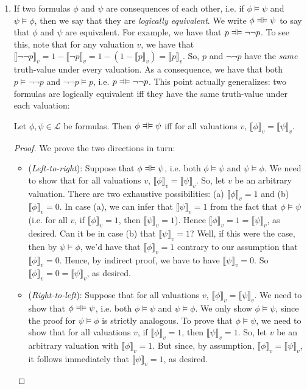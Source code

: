 \begin{enumerate}[\thesection.1]
		\item If two formulas $\phi$ and $\psi$ are consequences of each other, i.e. if $\phi\vDash\psi$ and $\psi\vDash\phi$, then we say that they are \emph{logically equivalent}. We write $\phi\equi \psi$ to say that $\phi$ and $\psi$ are equivalent. For example, we have that $p\equi \neg\neg p$. To see this, note that for any valuation $v$, we have that $\llbracket \neg\neg p\rrbracket_v=1-\llbracket \neg p\rrbracket_v=1-(1-\llbracket p\rrbracket_v)=\llbracket p\rrbracket_v$. So, $p$ and $\neg\neg p$ have the \emph{same} truth-value under every valuation. As a consequence, we have that both $p\vDash \neg\neg p$ and $\neg \neg p\vDash p$, i.e. $p\equi \neg\neg p$. This point actually generalizes: two formulas are logically equivalent iff they have the same truth-value under each valuation:
		\begin{proposition}
		Let $\phi,\psi\in\mathcal{L}$ be formulas. Then $\phi\equi\psi$ iff for all valuations $v$, $\llbracket\phi\rrbracket_v=\llbracket\psi\rrbracket_v$.
		\end{proposition}
		\begin{proof}
		We prove the two directions in turn:
		
			\begin{itemize}
			
				\item (\emph{Left-to-right}): Suppose that $\phi\equi\psi$, i.e. both $\phi\vDash\psi$ and $\psi\vDash\phi$. We need to show that for all valuations $v$, $\llbracket\phi\rrbracket_v=\llbracket\psi\rrbracket_v$. So, let $v$ be an arbitrary valuation. There are two exhaustive possibilities: (a) $\llbracket\phi\rrbracket_v=1$ and (b) $\llbracket \phi\rrbracket_v=0$. In case (a), we can infer that $\llbracket\psi\rrbracket_v=1$ from the fact that $\phi\vDash\psi$ (i.e. for all $v$, if $\llbracket\phi\rrbracket_v=1$, then $\llbracket\psi\rrbracket_v=1$). Hence $\llbracket \phi\rrbracket_v=1=\llbracket \psi\rrbracket_v$, as desired. Can it be in case (b) that $\llbracket\psi\rrbracket_v=1$? Well, if this were the case, then by $\psi\vDash\phi$, we'd have that $\llbracket\phi\rrbracket_v=1$ contrary to our assumption that $\llbracket\phi\rrbracket_v=0$. Hence, by indirect proof, we have to have $\llbracket\psi\rrbracket_v=0$. So $\llbracket \phi\rrbracket_v=0=\llbracket \psi\rrbracket_v$, as desired. 
				
				\item (\emph{Right-to-left}): Suppose that for all valuations $v$, $\llbracket\phi\rrbracket_v=\llbracket\psi\rrbracket_v$. We need to show that $\phi\equi\psi$, i.e. both $\phi\vDash\psi$ and $\psi\vDash\phi$. We only show $\phi\vDash\psi$, since the proof for  $\psi\vDash\phi$ is strictly analogous. To prove that $\phi\vDash\psi$, we need to show that for all valuations $v$, if $\llbracket\phi\rrbracket_v=1$, then $\llbracket\psi\rrbracket_v=1$. So, let $v$ be an arbitrary valuation with $\llbracket\phi\rrbracket_v=1$. But since, by assumption, $\llbracket\phi\rrbracket_v=\llbracket\psi\rrbracket_v$, it follows immediately that $\llbracket\psi\rrbracket_v=1$, as desired.
			\end{itemize}
		

\end{proof}
\end{enumerate}
